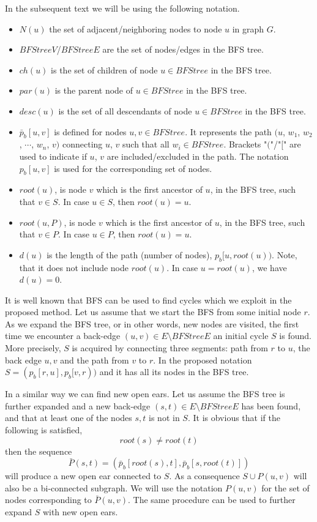 In the subsequent text we will be using the following notation. 
\begin{itemize}
\item{$N(u)$ the set  of adjacent/neighboring nodes to node $u$ in graph $G$. }
\item{$BFStreeV$/$BFStreeE$ are  the  set of nodes/edges in the BFS tree.  }
\item{$ch(u)$ is the set of children of node $u \in BFStree$ in the BFS tree.}
\item{$par(u)$ is the parent node of $u \in BFStree$ in the BFS tree.}
\item{$desc(u)$ is the set of all descendants of node $u \in BFStree$ in the BFS tree. }
\item{$\bar{p}_b[u,v]$ is defined for nodes $u, v \in BFStree$. It represents the path $(u$, $w_1$,  $w_2$, $\cdots$, $w_n$, $v)$ connecting $u$, $v$  such that  all $w_i \in BFStree$. Brackets "$($"/"$[$"  are used to indicate if $u$, $v$ are included/excluded in the path. The notation $p_b[u,v]$ is  used for the corresponding set of nodes. }
\item{$root(u)$}, is node $v$ which is the first ancestor of $u$, in the BFS tree, such that $v \in S$. In case  $u \in S$, then $root(u) = u$. 
\item{$root(u,P)$}, is node $v$ which is the first ancestor of $u$, in the BFS tree, such that $v \in P$. In case  $u \in P$, then $root(u) = u$. 
\item{$d(u)$} is the length of the path (number of nodes), $p_b[u, root(u))$. Note, that it does not include node $root(u)$. In case $u = root(u)$, we have $d(u) =0$. 
\end{itemize}
It is well known that BFS can be used to find cycles which we exploit in the proposed method. Let us assume that we start the BFS from some initial node $r$.  As we expand the BFS tree, or in other words, new nodes are visited,  the first time we encounter a back-edge $(u,v) \in E \setminus BFStreeE$ an initial cycle $S$ is found. More precisely,  $S$ is acquired by connecting three segments:  path from $r$ to $u$, the back edge $u,v$ and the path from $v$ to $r$. In the proposed notation $S=(p_b[r, u], p_b[v, r))$ and it has all its nodes in the BFS tree.  

In a similar way we can find new open ears. Let us assume the BFS tree is further expanded and a new back-edge $(s,t) \in E \setminus BFStreeE$ has been found, and that at least one of the nodes $s,t$ is not in $S$. It is obvious  that if the following is satisfied, 
\begin{equation}
	\label{ConDifRoot}
	root(s) \neq root(t) 
\end{equation}
then the sequence 
\begin{equation}
\label{PNormal}
\bar{P}(s,t) =  (\bar{p}_b[root(s),t], \bar{p}_b[s, root(t)])
\end{equation}
 will produce a new open ear connected to $S$. As a consequence $S \cup P(u,v)$ will also be a bi-connected subgraph. We will use the notation $P(u,v)$ for the set of nodes corresponding to $\bar{P}(u,v)$. The same procedure can be used to further expand $S$ with new open ears.
 
